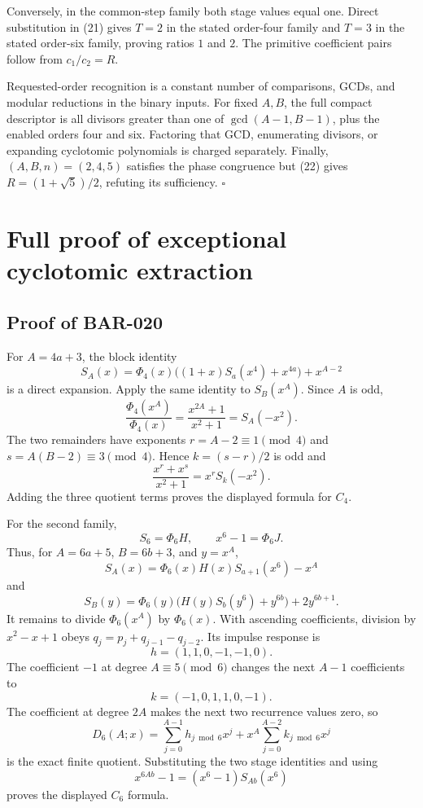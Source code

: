 \documentclass[11pt]{article}
\begin{document}
Conversely, in the common-step family both stage values equal one. Direct
substitution in (21) gives \(T=2\) in the stated order-four family and
\(T=3\) in the stated order-six family, proving ratios \(1\) and \(2\).
The primitive coefficient pairs follow from \(c_1/c_2=R\).

Requested-order recognition is a constant number of comparisons, GCDs, and
modular reductions in the binary inputs. For fixed \(A,B\), the full compact
descriptor is all divisors greater than one of
\(\gcd(A-1,B-1)\), plus the enabled orders four and six. Factoring that GCD,
enumerating divisors, or expanding cyclotomic polynomials is charged
separately. Finally, \((A,B,n)=(2,4,5)\) satisfies the phase congruence but
(22) gives \(R=(1+\sqrt5)/2\), refuting its sufficiency. \(\square\)

\section{Full proof of exceptional cyclotomic extraction}

\subsection{Proof of BAR-020}\label{proof:BAR-020}

For \(A=4a+3\), the block identity
\[
S_A(x)=\Phi_4(x)\bigl((1+x)S_a(x^4)+x^{4a}\bigr)+x^{A-2}
\]
is a direct expansion. Apply the same identity to \(S_B(x^A)\). Since
\(A\) is odd,
\[
\frac{\Phi_4(x^A)}{\Phi_4(x)}
=\frac{x^{2A}+1}{x^2+1}=S_A(-x^2).
\]
The two remainders have exponents \(r=A-2\equiv1\pmod4\) and
\(s=A(B-2)\equiv3\pmod4\). Hence \(k=(s-r)/2\) is odd and
\[
\frac{x^r+x^s}{x^2+1}=x^rS_k(-x^2).
\]
Adding the three quotient terms proves the displayed formula for \(C_4\).

For the second family,
\[
S_6=\Phi_6H,\qquad x^6-1=\Phi_6J.
\]
Thus, for \(A=6a+5\), \(B=6b+3\), and \(y=x^A\),
\[
S_A(x)=\Phi_6(x)H(x)S_{a+1}(x^6)-x^A
\]
and
\[
S_B(y)=\Phi_6(y)\bigl(H(y)S_b(y^6)+y^{6b}\bigr)+2y^{6b+1}.
\]
It remains to divide \(\Phi_6(x^A)\) by \(\Phi_6(x)\). With ascending
coefficients, division by \(x^2-x+1\) obeys
\(q_j=p_j+q_{j-1}-q_{j-2}\). Its impulse response is
\[
h=(1,1,0,-1,-1,0).
\]
The coefficient \(-1\) at degree \(A\equiv5\pmod6\) changes the next
\(A-1\) coefficients to
\[
k=(-1,0,1,1,0,-1).
\]
The coefficient at degree \(2A\) makes the next two recurrence values zero,
so
\[
D_6(A;x)=\sum_{j=0}^{A-1}h_{j\bmod6}x^j+
x^A\sum_{j=0}^{A-2}k_{j\bmod6}x^j
\]
is the exact finite quotient. Substituting the two stage identities and
using
\[
x^{6Ab}-1=(x^6-1)S_{Ab}(x^6)
\]
proves the displayed \(C_6\) formula.
\end{document}
